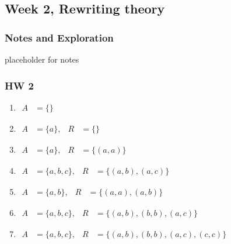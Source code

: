 \documentclass{article}
\theoremstyle{theorem}
\theoremstyle{definition}
\theoremstyle{remark}
\begin{document}
\subsection{Week 2, Rewriting theory}

\subsubsection{Notes and Exploration}
placeholder for notes

\subsubsection{HW 2}
\begin{enumerate}
  \item \(\begin{aligned}
           A &= \{\}
         \end{aligned}\)
         

  \item \(\begin{aligned}
           A &= \{a\}, & R &= \{\}
         \end{aligned}\)

  \item \(\begin{aligned}
           A &= \{a\}, & R &= \{(a,a)\}
         \end{aligned}\)

  \item \(\begin{aligned}
           A &= \{a,b,c\}, & R &= \{(a,b),(a,c)\}
         \end{aligned}\)

  \item \(\begin{aligned}
           A &= \{a,b\}, & R &= \{(a,a),(a,b)\}
         \end{aligned}\)

  \item \(\begin{aligned}
           A &= \{a,b,c\}, & R &= \{(a,b),(b,b),(a,c)\}
         \end{aligned}\)

  \item \(\begin{aligned}
           A &= \{a,b,c\}, & R &= \{(a,b),(b,b),(a,c),(c,c)\}
         \end{aligned}\)
\end{enumerate}
\end{document}
